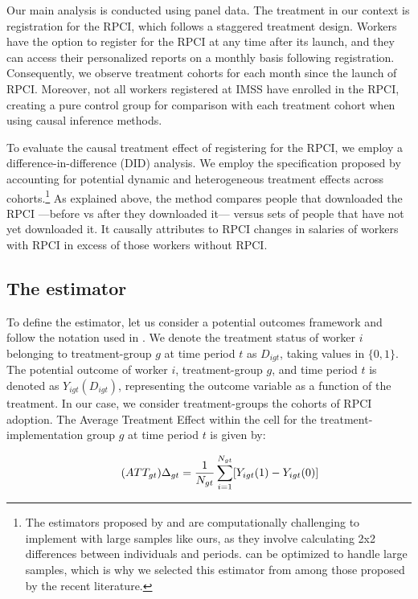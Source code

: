 \documentclass[oneside,11pt]{article}
\begin{document}
Our main analysis is conducted using panel data. The treatment in our context is registration for the RPCI, which follows a staggered treatment design. Workers have the option to register for the RPCI at any time after its launch, and they can access their personalized reports on a monthly basis following registration. Consequently, we observe treatment cohorts for each month since the launch of RPCI. Moreover, not all workers registered at IMSS have enrolled in the RPCI, creating a pure control group for comparison with each treatment cohort when using causal inference methods. 

To evaluate the causal treatment effect of registering for the RPCI, we employ a difference-in-difference (DID) analysis. We employ the specification proposed by \cite{de2020two} accounting for potential dynamic and heterogeneous treatment effects across cohorts.\footnote{The estimators proposed by \cite{callaway2021difference} and \cite{sun2021estimating} are computationally challenging to implement with large samples like ours, as they involve calculating 2x2 differences between individuals and periods. \cite{de2020two} can be optimized to handle large samples, which is why we selected this estimator from among those proposed by the recent literature.} As explained above, the method compares people that downloaded the RPCI ---before vs after they downloaded it--- versus sets of people that have not yet downloaded it. It causally attributes to RPCI changes in salaries of workers with RPCI in excess of those workers without RPCI.


\subsection{The estimator}

To define the estimator, let us consider a potential outcomes framework and follow the notation used in \cite{de2020two}. We denote the treatment status of worker $i$ belonging to treatment-group $g$ at time period $t$ as $D_{igt}$, taking values in $\{0,1\}$. The potential outcome of worker $i$, treatment-group $g$, and time period $t$ is denoted as $Y_{igt}(D_{igt})$, representing the outcome variable as a function of the treatment. In our case, we consider treatment-groups the cohorts of RPCI adoption. The Average Treatment Effect within the cell for the treatment-implementation group $g$ at time period $t$ is given by:

\begin{equation}
    \tag{$ATT_{gt}$}
    \Delta_{gt} = \frac{1}{N_{gt}} \sum_{i=1}^{N_{gt}} [Y_{igt}(1) - Y_{igt}(0)]
\end{equation}
\end{document}
